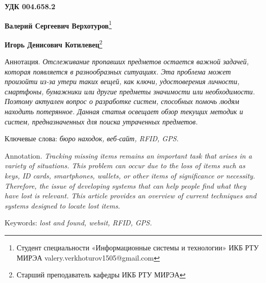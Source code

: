 \documentclass{mirea-article}
\begin{document}
	
	\textbf{УДК 004.658.2}
	
	\begin{FlushRight}
		\textbf{Валерий Сергеевич Верхотуров}\footnote{Студент специальности «Информационные системы и технологии» ИКБ РТУ МИРЭА valery.verkhoturov1505@gmail.com} 

		\textbf{Игорь Денисович Котилевец}\footnote{Старший преподаватель кафедры ИКБ РТУ МИРЭА}
	\end{FlushRight}
	
	
	Аннотация. \textit{Отслеживание пропавших предметов остается важной задачей, которая появляется в разнообразных ситуациях. Эта проблема может произойти из-за утери таких вещей, как ключи, удостоверения личности, смартфоны, бумажники или другие предметы значимости или необходимости. Поэтому актуален вопрос о разработке систем, способных помочь людям находить потерянное. Данная статья освещает обзор текущих методик и систем, предназначенных для поиска утраченных предметов.}
	
	Ключевые слова: \textit{бюро находок, веб-сайт, RFID, GPS.}
	
	
	Annotation. \textit{Tracking missing items remains an important task that arises in a variety of situations. This problem can occur due to the loss of items such as keys, ID cards, smartphones, wallets, or other items of significance or necessity. Therefore, the issue of developing systems that can help people find what they have lost is relevant. This article provides an overview of current techniques and systems designed to locate lost items.}
	
	Keywords: \textit{lost and found, websit, RFID, GPS.}
	
\end{document}
